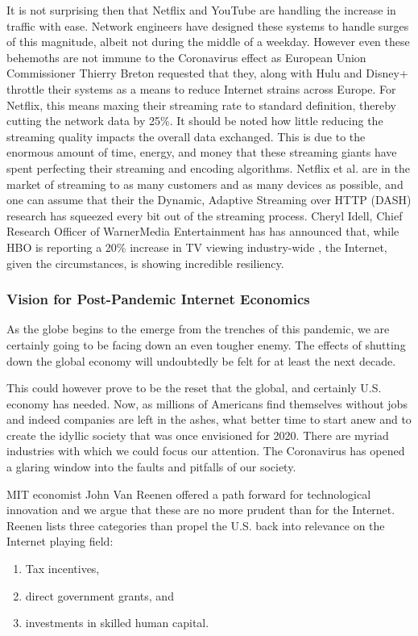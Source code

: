 \documentclass[journal]{IEEEtran}
\begin{document}
It is not surprising then that Netflix and YouTube are handling the increase in traffic with ease. Network engineers have designed these systems to handle surges of this magnitude, albeit not during the middle of a weekday. However even these behemoths are not immune to the Coronavirus effect as European Union Commissioner Thierry Breton requested that they, along with Hulu and Disney+ throttle their systems \cite{Forbes_Scaleback} as a means to reduce Internet strains across Europe. For Netflix, this means maxing their streaming rate to standard definition, thereby cutting the network data by 25\%. It should be noted how little reducing the streaming quality impacts the overall data exchanged. This is due to the enormous amount of time, energy, and money that these streaming giants have spent perfecting their streaming and encoding algorithms. Netflix et al. are in the market of streaming to as many customers and as many devices as possible, and one can assume that their the Dynamic, Adaptive Streaming over HTTP (DASH) research has squeezed every bit out of the streaming process. Cheryl Idell, Chief Research Officer of WarnerMedia Entertainment has has announced that, while HBO is reporting a 20\% increase in TV viewing industry-wide \cite{HBO}, the Internet, given the circumstances, is showing incredible resiliency.

\subsubsection{Vision  for  Post-Pandemic  Internet  Economics}

As the globe begins to the emerge from the trenches of this pandemic, we are certainly going to be facing down an even tougher enemy. The effects of shutting down the global economy will undoubtedly be felt for at least the next decade.

This could however prove to be the reset that the global, and certainly U.S. economy has needed. Now, as millions of Americans find themselves without jobs and indeed companies are left in the ashes, what better time to start anew and to create the idyllic society that was once envisioned for 2020. There are myriad industries with which we could focus our attention. The Coronavirus has opened a glaring window into the faults and pitfalls of our society.

MIT economist John Van Reenen offered a path forward for technological innovation \cite{MIT_Economist} and we argue that these are no more prudent than for the Internet. Reenen lists three categories than propel the U.S. back into relevance on the Internet playing field:
\begin{enumerate}
    \item Tax incentives,
    \item direct government grants, and
    \item investments in skilled human capital.
\end{enumerate}
\end{document}
